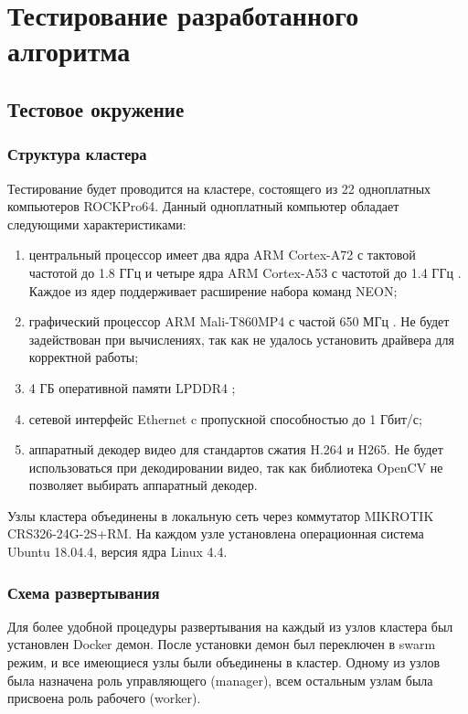 \section{Тестирование разработанного алгоритма}

\subsection{Тестовое окружение}

\subsubsection{Структура кластера}

Тестирование будет проводится на кластере, состоящего из 22 одноплатных компьютеров ROCKPro64. Данный одноплатный 
компьютер обладает следующими характеристиками:

\begin{enumerate}
\item центральный процессор имеет два ядра ARM Cortex-A72 с тактовой частотой до 1.8 ГГц и четыре ядра ARM Cortex-A53 
с частотой до 1.4 ГГц \cite{RK3399}. Каждое из ядер поддерживает расширение набора команд NEON;
\item графический процессор ARM Mali-T860MP4 с частой 650 МГц \cite{MALI_GPU}. Не будет задействован при вычислениях, 
так как не удалось установить драйвера для корректной работы;
\item 4 ГБ оперативной памяти LPDDR4 \cite{ROCKPRO64};
\item сетевой интерфейс Ethernet c пропускной способностью до 1 Гбит/с;
\item аппаратный декодер видео для стандартов сжатия H.264 и H265. Не будет использоваться при декодировании видео, так 
как библиотека OpenCV не позволяет выбирать аппаратный декодер.
\end{enumerate}

Узлы кластера объединены в локальную сеть через коммутатор MIKROTIK CRS326-24G-2S+RM. На каждом узле установлена 
операционная система Ubuntu 18.04.4, версия ядра Linux 4.4.

\subsubsection{Схема развертывания}

Для более удобной процедуры развертывания на каждый из узлов кластера был установлен Docker демон. После установки демон
был переключен в swarm режим, и все имеющиеся узлы были объединены в кластер. Одному из узлов была назначена роль 
управляющего (manager), всем остальным узлам была присвоена роль рабочего (worker).

